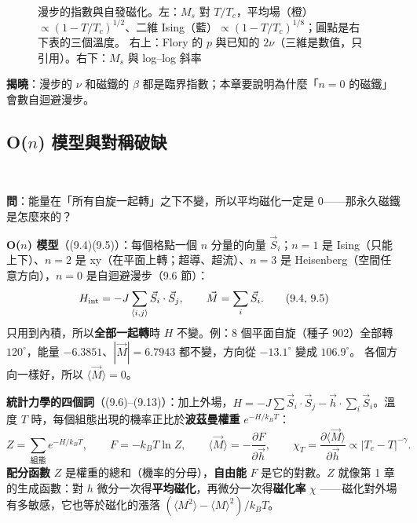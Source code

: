 \begin{figure}[htbp]
\centering
\begin{minipage}[c]{0.52\linewidth}\centering\NineFigMs\end{minipage}\hfill
\begin{minipage}[c]{0.46\linewidth}\centering\footnotesize\setlength{\tabcolsep}{3.5pt}\NineTabFlory\\[8pt]\NineTabMs\end{minipage}
\caption{漫步的指數與自發磁化。左：$M_s$ 對 $T/T_c$，平均場（橙）$\propto(1-T/T_c)^{1/2}$、二維 Ising（藍）$\propto(1-T/T_c)^{1/8}$；圓點是右下表的三個溫度。
右上：Flory 的 $p$ 與已知的 $2\nu$（三維是數值，只引用）。右下：$M_s$ 與 log--log 斜率}\label{nine-fig-ms}
\end{figure}

\textbf{揭曉}：漫步的 $\nu$ 和磁鐵的 $\beta$ 都是臨界指數；本章要說明為什麼「$n=0$ 的磁鐵」會數自迴避漫步。

\subsection{\texorpdfstring{O($n$)}{O(n)} 模型與對稱破缺}
\leavevmode{}\ \par\nopagebreak

\textbf{問}：能量在「所有自旋一起轉」之下不變，所以平均磁化一定是 0——那永久磁鐵是怎麼來的？

\textbf{O($n$) 模型}（(9.4)(9.5)）：每個格點一個 $n$ 分量的向量 $\vec S_i$；$n=1$ 是 Ising（只能上下）、$n=2$ 是 xy（在平面上轉；超導、超流）、$n=3$ 是 Heisenberg（空間任意方向），$n=0$ 是自迴避漫步（9.6 節）：
\[H_{\rm int}=-J\sum_{\langle i,j\rangle}\vec S_i\cdot\vec S_j,\qquad\vec M=\sum_i\vec S_i .\tag{9.4, 9.5}\]
只用到內積，所以\textbf{全部一起轉}時 $H$ 不變。例：8 個平面自旋（種子 902）全部轉 $120^\circ$，能量 $-6.3851$、$|\vec M|=6.7943$ 都不變，方向從 $-13.1^\circ$ 變成 $106.9^\circ$。
各個方向一樣好，所以 $\langle\vec M\rangle=0$。

\textbf{統計力學的四個詞}（(9.6)--(9.13)）：加上外場，$H=-J\sum\vec S_i\cdot\vec S_j-\vec h\cdot\sum_i\vec S_i$。溫度 $T$ 時，每個組態出現的機率正比於\textbf{波茲曼權重} $e^{-H/k_BT}$：
\[Z=\sum_{\text{組態}}e^{-H/k_BT},\qquad F=-k_BT\ln Z,\qquad\langle\vec M\rangle=-\frac{\partial F}{\partial\vec h},\qquad\chi_T=\frac{\partial\langle\vec M\rangle}{\partial\vec h}\propto|T_c-T|^{-\gamma}.\tag{9.8--9.13}\]
\textbf{配分函數} $Z$ 是權重的總和（機率的分母），\textbf{自由能} $F$ 是它的對數。$Z$ 就像第 1 章的生成函數：對 $h$ 微分一次得\textbf{平均磁化}，再微分一次得\textbf{磁化率} $\chi$
——磁化對外場有多敏感，它也等於磁化的漲落 $(\langle M^2\rangle-\langle M\rangle^2)/k_BT$。

